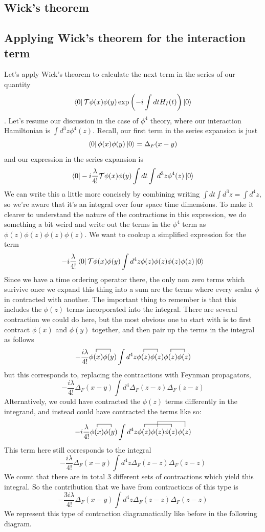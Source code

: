 \documentclass[11pt, oneside]{article}   	%
\theoremstyle{newline}
\theoremstyle{newline}
\theoremstyle{newline}
\theoremstyle{newline}
\theoremstyle{newline}
\begin{document}
\subsection{Wick's theorem} 

\subsection{Applying Wick's theorem for the interaction term}
Let's apply Wick's theorem to calculate the next term in the series of our quantity \[ \bra{0} \mathcal{T} \phi(x) \phi(y) \exp \left(  -i  \int dt H_I(t) \right) \ket{0} \] . Let's resume our discussion in the case of $\phi^4$ theory, where our interaction Hamiltonian is $\int d^3 z \phi^4(z) $. Recall, our first term in the series expansion is just \[ \bra{0} \phi(x) \phi(y) \ket{0} = \Delta_F(x -y)  \] and our expression in the series expansion is \[ \bra{0} -i\frac{ \lambda} { 4!}   \mathcal{T} \phi(x) \phi(y)  \int dt \int d^3 z \phi^4 (z) \ket{0} \]       
We can write this a little more concisely by combining writing $\int dt \int d^3z = \int d^4 z$, so we're aware that it's an integral over four space time dimensions. To make it clearer to understand the nature of the contractions in this expression, we do something a bit weird and write out the terms in the $\phi^4$ term as $\phi(z)\phi(z)\phi(z) \phi(z)$. 
We want to cookup a simplified expression for the term \[  - i \frac{ \lambda} {4!} \bra{0}\mathcal{T} \phi(x) \phi(y) \int d^4 z \phi(z) \phi(z) \phi(z) \phi(z) \ket{0} \] Since we have a time ordering operator there, the only non zero terms which surivive once we expand this thing into a sum are the terms where every scalar $\phi$ in contracted with another. The important thing to remember is that this includes the $\phi(z) $ terms incorporated into the integral. There are several contraction we could do here, but the most obvious one to start with is to first contract $\phi(x)$ and $\phi(y)$ together, and then pair up the terms in the integral as follows \[ 
- \frac{ i \lambda} { 4!} \contraction{}{\phi(x) }{} { \phi(y) } \phi(x) \phi(y) \int d^4 z \contraction{}{\phi(z)}{} { \phi(z) } \phi(z) \phi(z) \contraction{}{\phi(z) }{}{\phi(z) } \phi(z) \phi(z) \] but this corresponds to, replacing the contractions with Feynman propagators, \[ - \frac{i \lambda} { 4!} \Delta_F( x - y ) \int d^4 \Delta_F(z - z) \Delta_F(z - z) \] 
Alternatively, we could have contracted the $\phi(z)$ terms differently in the integrand, and instead could have contracted the terms like so: 
\[ - i \frac{ \lambda} { 4!} \contraction{}{\phi(x) }{ } {\phi(y) } \phi(x) \phi(y)  \int d^4 z \contraction{} {\phi(z)}{\phi(z)}{ \phi(z) }  \contraction[2ex]{\phi(z)}{\phi(z)}{\phi(z)}{\phi(z) } \phi(z) \phi(z) \phi(z) \phi(z) \] 
This term here still corresponds to the integral  \[ - \frac{i \lambda} { 4!} \Delta_F( x - y ) \int d^4 z \Delta_F(z - z) \Delta_F(z - z) \]
We count that there are in total 3 different sets of contractions which yield this integral. So the contribution that we have from contractions of this type is  \[ - \frac{3 i \lambda} { 4!} \Delta_F( x - y ) \int d^4 z  \Delta_F(z - z) \Delta_F(z - z) \]   
We represent this type of contraction diagramatically like before in the following diagram.
\end{document}
